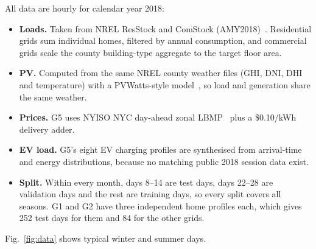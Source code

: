 \documentclass[conference]{IEEEtran}
\newcommand{\G}[1]{\textsf{#1}}
\begin{document}
All data are hourly for calendar year 2018:
\begin{itemize}
\item \textbf{Loads.} Taken from NREL ResStock and ComStock (AMY2018)~\cite{wilson2022eulp}. Residential grids sum individual homes, filtered by annual consumption, and commercial grids scale the county building-type aggregate to the target floor area.
\item \textbf{PV.} Computed from the same NREL county weather files (GHI, DNI, DHI and temperature) with a PVWatts-style model~\cite{dobos2014pvwatts}, so load and generation share the same weather.
\item \textbf{Prices.} \G{G5} uses NYISO NYC day-ahead zonal LBMP~\cite{nyiso} plus a \$0.10/kWh delivery adder.
\item \textbf{EV load.} \G{G5}'s eight EV charging profiles are synthesised from arrival-time and energy distributions, because no matching public 2018 session data exist.
\item \textbf{Split.} Within every month, days 8--14 are test days, days 22--28 are validation days and the rest are training days, so every split covers all seasons. \G{G1} and \G{G2} have three independent home profiles each, which gives 252 test days for them and 84 for the other grids.
\end{itemize}
Fig.~\ref{fig:data} shows typical winter and summer days.

\begin{table}[t]
\centering
\caption{Microgrid archetypes (all data: calendar year 2018). DC = demand charge.}
\label{tab:grids}
\setlength{\tabcolsep}{4pt}
\end{table}
\end{document}
